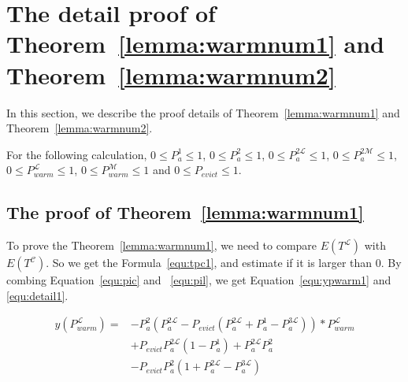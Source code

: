 \newpage
\section{The detail proof of Theorem~\ref{lemma:warmnum1} and Theorem~\ref{lemma:warmnum2}}
\label{appendixa}
In this section, we describe the proof details of Theorem~\ref{lemma:warmnum1} and Theorem~\ref{lemma:warmnum2}.

For the following calculation, $0 \leq P_{a}^{\mathfrak{1}} \leq 1$, $0 \leq P_{a}^{\mathfrak{2}} \leq 1$, $0 \leq P_{a}^{\mathfrak{2}\mathcal{L}} \leq 1$, $0 \leq P_{a}^{\mathfrak{2}\mathcal{M}} \leq 1$, $0 \leq P_{warm}^{\mathcal{L}} \leq 1$, $0 \leq P_{warm}^{\mathcal{M}} \leq 1$
 and $0 \leq P_{evict} \leq 1$.

\subsection{The proof of Theorem~\ref{lemma:warmnum1}}
To prove the Theorem~\ref{lemma:warmnum1}, we need to compare $E(T^{\mathcal{L}})$ with $E(T^{\mathcal{C}})$.
So we get the Formula~\ref{equ:tpc1}, and estimate if it is larger than $0$.
By combing Equation~\ref{equ:pic} and ~\ref{equ:pil}, we get Equation~\ref{equ:ypwarm1} and \ref{equ:detail1}.

\begin{equation}
\label{equ:ypwarm1}
\begin{split}
y(P_{warm}^{\mathcal{L}}) =& -P_{a}^{\mathfrak{2}}(P_{a}^{\mathfrak{2}\mathcal{L}}-P_{evict}(P_{a}^{\mathfrak{2}\mathcal{L}}+P_{a}^{\mathfrak{1}}-P_{a}^{\mathfrak{3}\mathcal{L}}))*P_{warm}^{\mathcal{L}} \\
& +  P_{evict}P_{a}^{\mathfrak{2}\mathcal{L}}(1-P_{a}^{\mathfrak{1}})+P_{a}^{\mathfrak{2}\mathcal{L}}P_{a}^{\mathfrak{2}}\\
& - P_{evict}P_{a}^{\mathfrak{2}}(1+P_{a}^{\mathfrak{2}\mathcal{L}}-P_{a}^{\mathfrak{3}\mathcal{L}}) \,
\end{split}\end{equation}


